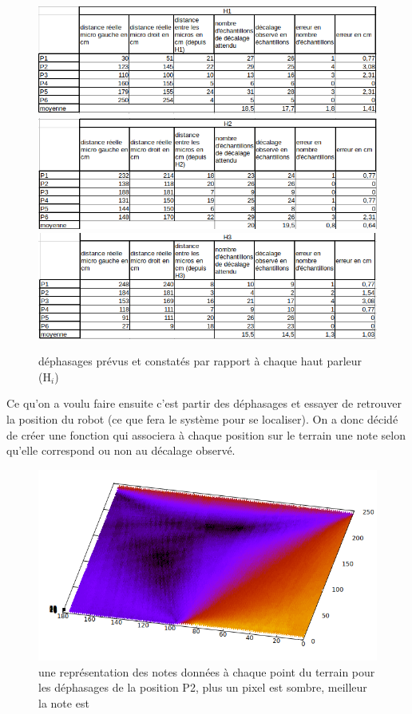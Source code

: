 \documentclass[12pt,a4paper]{report}
\begin{document}
\begin{figure}[H]
\includegraphics[width=12cm]{../tests/simu_coupe_de_france_a_la_main/dist_h1.png}
\includegraphics[width=12cm]{../tests/simu_coupe_de_france_a_la_main/dist_h2.png}
\includegraphics[width=12cm]{../tests/simu_coupe_de_france_a_la_main/dist_h3.png}
\caption{déphasages prévus et constatés par rapport à chaque haut parleur (H$_{i}$) }
\end{figure}
Ce qu'on a voulu faire ensuite c'est partir des déphasages et essayer de retrouver la position du robot (ce que fera le système pour se localiser). On a donc décidé de créer une fonction qui associera à chaque position sur le terrain une note selon qu'elle correspond ou non au décalage observé.
\begin{figure}[H]
\includegraphics[width=15cm]{../tests/simu_coupe_de_france_a_la_main/P2.png}
\caption{une représentation des notes données à chaque point du terrain pour les déphasages de la position P2, plus un pixel est sombre, meilleur la note est}
\end{figure}
\end{document}
